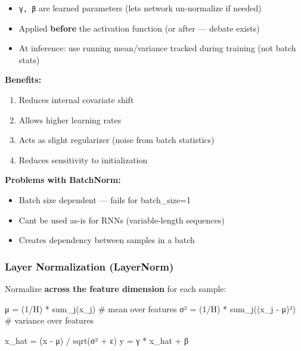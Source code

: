 \documentclass[11pt]{article}
\providecommand{\tightlist}{\setlength{\itemsep}{1pt}\setlength{\parskip}{0pt}}
\newenvironment{Shaded}{\begin{snugshade}}{\end{snugshade}}
\newcommand{\CommentTok}[1]{\textcolor[rgb]{0.48,0.49,0.49}{#1}}
\newcommand{\DecValTok}[1]{\textcolor[rgb]{0.96,0.45,0.00}{#1}}
\newcommand{\NormalTok}[1]{\textcolor[rgb]{0.81,0.81,0.76}{#1}}
\newcommand{\OperatorTok}[1]{\textcolor[rgb]{0.81,0.81,0.76}{#1}}
\begin{document}
\begin{itemize}
\tightlist
\item
  \texttt{γ,\ β} are learned parameters (lets network un-normalize if needed)
\item
  Applied \textbf{before} the activation function (or after --- debate exists)
\item
  At inference: use running mean/variance tracked during training (not batch stats)
\end{itemize}

\textbf{Benefits:}

\begin{enumerate}
\def\labelenumi{\arabic{enumi}.}
\tightlist
\item
  Reduces internal covariate shift
\item
  Allows higher learning rates
\item
  Acts as slight regularizer (noise from batch statistics)
\item
  Reduces sensitivity to initialization
\end{enumerate}

\textbf{Problems with BatchNorm:}

\begin{itemize}
\tightlist
\item
  Batch size dependent --- fails for batch\_size=1
\item
  Can\textquotesingle t be used as-is for RNNs (variable-length sequences)
\item
  Creates dependency between samples in a batch
\end{itemize}

\subsubsection{Layer Normalization (LayerNorm)}\label{layer-normalization-layernorm}

Normalize \textbf{across the feature dimension} for each sample:


\begin{Shaded}
\begin{Highlighting}[]
\NormalTok{μ }\OperatorTok{=}\NormalTok{ (}\DecValTok{1}\OperatorTok{/}\NormalTok{H) }\OperatorTok{*}\NormalTok{ sum\_j(x\_j)            }\CommentTok{\# mean over features}
\NormalTok{σ² }\OperatorTok{=}\NormalTok{ (}\DecValTok{1}\OperatorTok{/}\NormalTok{H) }\OperatorTok{*}\NormalTok{ sum\_j((x\_j }\OperatorTok{{-}}\NormalTok{ μ)²)   }\CommentTok{\# variance over features}

\NormalTok{x\_hat }\OperatorTok{=}\NormalTok{ (x }\OperatorTok{{-}}\NormalTok{ μ) }\OperatorTok{/}\NormalTok{ sqrt(σ² }\OperatorTok{+}\NormalTok{ ε)}
\NormalTok{y }\OperatorTok{=}\NormalTok{ γ }\OperatorTok{*}\NormalTok{ x\_hat }\OperatorTok{+}\NormalTok{ β}
\end{Highlighting}
\end{Shaded}
\end{document}
